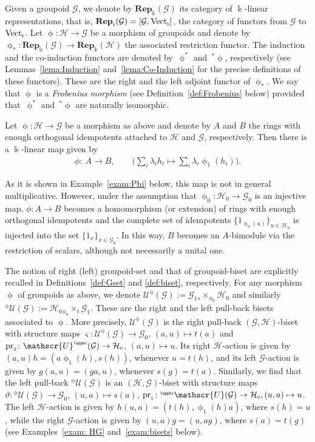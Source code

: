 \documentclass[10pt,a4paper]{amsart}
\numberwithin{equation}{section}
\newcommand{\Rep}[1]{\mathbf{Rep}_{\Sscript{\Bbbk}}(#1)}
\newcommand{\Vect}{{\rm Vect}_{\Sscript{\Bbbk}}}
\newcommand{\Go}{\cG_{\Sscript{0}}}
\newcommand{\Ga}{\cG_{\Sscript{1}}}
\newcommand{\Ho}{\cH_{\Sscript{0}}}
\newcommand{\uU}{\mathscr{U}}
\newcommand{\cG}{{\mathcal G}}
\newcommand{\cH}{{\mathcal H}}
\newcommand{\Sscript}[1]{\scriptscriptstyle{#1}}
\newcommand{\due}[3]{{}_{{#2 }} {#1}_{{ #3}} }
\newcommand{\upg}{\uU^{\Sscript{\upphi}}(\cG)}
\newcommand{\pug}{{}^{\Sscript{\upphi}}\uU(\cG)}
\newcommand{\phio}{\upphi_{\Sscript{0}}}
\newcommand{\phia}{\upphi_{\Sscript{1}}}
\begin{document}
Given a groupoid $\cG$, we denote by $\Rep{\cG}$ its category of $\Bbbk$-linear representations, that is, $\Rep{\cG}=[\cG, \Vect]$, the category of functors from $\cG$ to $\Vect$. Let $\upphi \colon \cH \to \cG$ be a morphism of groupoids and denote by $\upphi_{\Sscript{*}}\colon \Rep{\cG} \to \Rep{\cH}$ the associated restriction functor. The induction and the co-induction functors are denoted by~$\upphi^{*}$ and~${}^{*}\upphi$, respectively (see Lemmas~\ref{lema:Induction} and~\ref{lema:Co-Induction} for the precise definitions of these functors). These are the right and the left adjoint functor of $\upphi_{\Sscript{*}}$. We say that $\upphi$ is a \emph{Frobenius morphism} (see Definition~\ref{def:Frobenius} below) provided that~$\upphi^{*}$ and~${}^{*}\upphi$ are naturally isomorphic.

 Let $\upphi\colon \cH \to \cG$ be a morphism as above and denote by $A$ and $B$ the rings with enough orthogonal idempotents attached to $\cH$ and $\cG$, respectively. Then there is a $\Bbbk$-linear map given by
\begin{gather}\label{Eq:phi}
\phi\colon \ A \longrightarrow B, \qquad \bigg( \sum_i \lambda_i h_i \longmapsto \sum_i \lambda_i \phia(h_i)\bigg).
\end{gather}

As it is shown in Example~\ref{exam:Phi} below, this map is not in general multiplicative. However, under the assumption that $\phio\colon \Ho \to \Go$ is an injective map, $\phi\colon A \to B$ becomes a homomorphism (or extension) of rings with enough orthogonal idempotents and the complete set of idempotents $\{1_{\Sscript{\phio(u)}}\}_{u \in \Ho}$ is injected into the set $\{1_{\Sscript{x}}\}_{x \in \Go}$. In this way, $B$ becomes an $A$-bimodule via the restriction of scalars, although not necessarily a unital one.

The notion of right (left) groupoid-set and that of groupoid-biset are explicitly recalled in Definitions~\ref{def:Gset} and \ref{def:biset}, respectively. For any morphism $\upphi$ of groupoids as above, we denote $\upg:=\Ga \due \times {\Sscript{s}}{ \Sscript{\upphi_0} } \Ho$ and similarly ${ }^{\Sscript{\upphi}}\uU(\cG):=\Ho \due \times{\Sscript{\upphi_0}}{ \Sscript{t}} \Ga$. These are the right and the left pull-back bisets associated to $\upphi$. More precisely, $\upg$ is the right pull-back $(\cG,\cH)$-biset with structure maps $\varsigma\colon \upg \to \Go$, $(a,u) \mapsto t(a)$ and ${\rm pr}_{\Sscript{2}}\colon \upg \to \Ho$, $(a,u) \mapsto u$. Its right $\cH$-action is given by $(a,u) h= (a\phia(h), s(h))$, whenever $u=t(h)$, and its left $\cG$-action is given by $g(a,u)=(ga,u)$, whenever $s(g)=t(a)$. Similarly, we find that the left pull-back ${ }^{\Sscript{\upphi}}\uU(\cG)$ is an $(\cH,\cG)$-biset with structure maps $\vartheta\colon {}^{\Sscript{\upphi}}\uU(\cG) \to \Go$, $(u,a) \mapsto s(a)$, ${\rm pr}_{\Sscript{1}}\colon \pug \to \Ho, (u,a) \mapsto u$. The left $\cH$-action is given by $h (u,a)=(t(h), \phia(h)a)$, where $s(h)=u$, while the right $\cG$-action is given by $(u,a) g=(u,ag)$, where $s(a)=t(g)$ (see Examples~\ref{exam: HG} and~\ref{exam:bisets} below).
\end{document}
